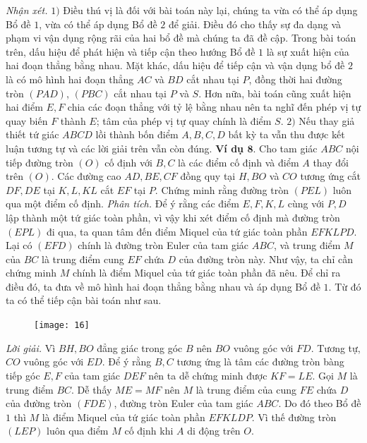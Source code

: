 \begin{multicols}{2}
	\textit{Nhận xét.} $1)$ Điều thú vị là đối với bài toán này lại, chúng ta vừa có thể áp dụng Bổ đề $1$, vừa có thể áp dụng Bổ đề $2$ để giải. Điều đó cho thấy sự đa dạng và phạm vi vận dụng rộng rãi của hai bổ đề mà chúng ta đã đề cập. Trong bài toán trên, dấu hiệu để phát hiện và tiếp cận theo hướng Bổ đề $1$  là sự xuất hiện của hai đoạn thẳng bằng nhau. Mặt khác, dấu hiệu để tiếp cận và vận dụng bổ đề $2$ là có mô hình hai đoạn thẳng $AC$ và $BD$ cắt nhau tại $P$, đồng thời hai đường tròn $(PAD)$, $(PBC)$ cắt nhau tại $P$ và $S$. Hơn nữa, bài toán cũng xuất hiện hai điểm $E,F$ chia các đoạn thẳng với tỷ lệ bằng nhau nên ta nghĩ đến phép vị tự quay biến $F$ thành $E$; tâm của phép vị tự quay chính là điểm $S$.
	\vskip 0.1cm
	$2)$ Nếu thay giả thiết tứ giác $ABCD$ lồi thành bốn điểm $A, B, C, D$ bất kỳ ta vẫn thu được kết luận tương tự và các lời giải trên vẫn còn đúng.
	\vskip 0.1cm
	\textbf{\color{diendantoanhoc}Ví dụ $\pmb{8.}$} Cho tam giác $ABC$ nội tiếp đường tròn $(O)$ cố định với $B,C$ là các điểm cố định và điểm $A$ thay đổi trên $(O)$. Các đường cao $AD,BE,CF$ đồng quy tại $H,BO$ và $CO$ tương ứng cắt $DF,DE$ tại $K,L,KL$ cắt $EF$ tại $P$. Chứng minh rằng đường tròn $(PEL)$ luôn qua một điểm cố định.
	\vskip 0.1cm
	\textit{Phân tích.} Để ý rằng các điểm $E,F,K,L$ cùng với $P,D$ lập thành một tứ giác toàn phần, vì vậy khi xét điểm cố định mà đường tròn $(EPL)$ đi qua, ta quan tâm đến điểm Miquel của tứ giác toàn phần $EFKLPD$. Lại có $(EFD)$ chính là đường tròn Euler của tam giác $ABC$, và trung điểm $M$ của $BC$ là trung điểm cung $EF$ chứa $D$ của đường tròn này. Như vậy, ta chỉ cần chứng minh $M$ chính là điểm Miquel của tứ giác toàn phần đã nêu. Để chỉ ra điều đó, ta đưa về mô hình hai đoạn thẳng bằng nhau và áp dụng Bổ đề $1$. Từ đó ta có thể tiếp cận bài toán như sau.
	\begin{figure}[H]
		\vspace*{-5pt}
		\centering
		\captionsetup{labelformat= empty, justification=centering}
		\texttt{[image: 16]}
		\vspace*{-10pt}
	\end{figure}
	\textit{Lời giải.} Vì $BH, BO$ đẳng giác trong góc $B$ nên $BO$ vuông góc với $FD$. Tương tự, $CO$ vuông góc với $ED$. Để ý rằng $B,C$ tương ứng là tâm các đường tròn bàng tiếp góc $E,F$ của tam giác $DEF$ nên ta dễ chứng minh được $KF=LE$. Gọi $M$ là trung điểm $BC$. Dễ thấy $ME=MF$ nên $M$ là trung điểm của cung $FE$ chứa $D$ của đường tròn $(FDE)$, đường tròn Euler của tam giác $ABC$. Do đó theo Bổ đề $1$ thì $M$ là điểm Miquel của tứ giác toàn phần $EFKLDP$. Vì thế đường tròn $(LEP)$ luôn qua điểm $M$ cố định khi $A$ di động trên $O$.

\end{multicols}
